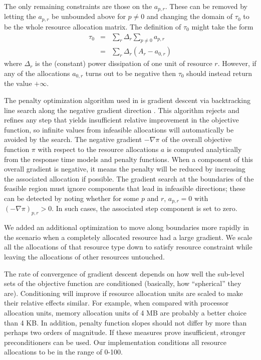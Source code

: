 The only remaining constraints are those on the $a_{p,r}$.
These can be removed by letting the $a_{p,r}$ be unbounded above for $p \neq 0$
and changing the domain of $\tau_0$  to be the whole resource allocation matrix.
The definition of $\tau_0$ might take the form
\begin{eqnarray*}
\tau_0 &=& \sum_r \Delta_r \sum_{p \neq 0} a_{p,r}     \\
       &=& \sum_r \Delta_r (A_r - a_{0,r})
\end{eqnarray*}
where $\Delta_r$ is the (constant) power dissipation of one unit of resource $r$.
However, if any of the allocations $a_{0,r}$ turns out to be negative then $\tau_0$  should instead return the value $+\infty$.

The penalty optimization algorithm used in \pacora is gradient descent via backtracking line search along the negative gradient direction \cite{BoVa}.
This algorithm rejects and refines any step that yields insufficient relative improvement in the objective function,
so infinite values from infeasible allocations will automatically be avoided by the search.
The negative gradient $-\nabla\pi$ of the overall objective function $\pi$
with respect to the resource allocations $a$
is computed analytically from the response time models and penalty functions.
When a component of this overall gradient is negative,
it means the penalty will be reduced by increasing the associated allocation if possible.
The gradient search at the boundaries of the feasible region
must ignore components that lead in infeasible directions;
these can be detected by noting whether for some $p$ and $r$, $a_{p,r} = 0$ with $(-\nabla\pi)_{p,r} > 0$.
In such cases, the associated step component is set to zero.

We added an additional optimization to move along boundaries more rapidly in the scenario when a completely allocated resource had a large gradient.  We scale all the allocations of that resource type down to satisfy resource constraint while leaving the allocations of other resources untouched.

The rate of convergence of gradient descent depends on how well the sub-level sets of the objective function
are conditioned (basically, how ``spherical'' they are).
Conditioning will improve if resource allocation units are scaled to make their relative effects similar.
For example, when compared with processor allocation units,
memory allocation units of 4 MB are probably a better choice than 4 KB.
In addition, penalty function slopes should not differ by more than perhaps two orders of magnitude. If these measures prove insufficient, stronger preconditioners can be used. Our implementation conditions all resource allocations to be in the range of 0-100.

